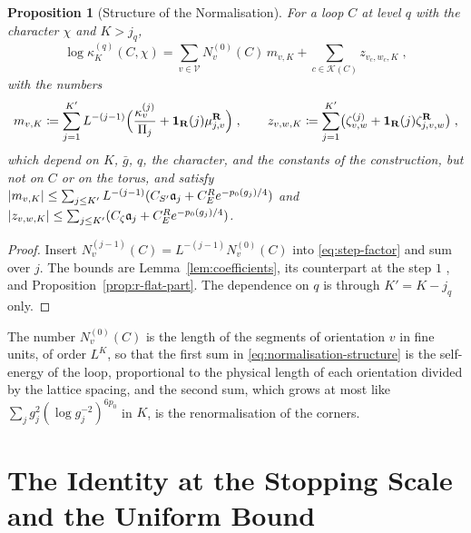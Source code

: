 \documentclass[11pt]{preprint}
\DeclarePairedDelimiter{\abs}{\lvert}{\rvert}
\numberwithin{equation}{section}
\newtheorem{proposition}[theorem]{Proposition}
\theoremstyle{definition}
\theoremstyle{remark}
\theoremstyle{plain}
\begin{document}
\begin{proposition}[Structure of the Normalisation]\label{prop:normalisation-structure}
For a loop $C$ at level $q$ with the character $\chi$ and $K > j_q$,
\begin{equation}\label{eq:normalisation-structure}
    \log\kappa^{(q)}_K(C, \chi) = \sum_{v \in \mathcal V}N^{(0)}_v(C)\,m_{v,K} + \sum_{c \in \mathcal K(C)}z_{v_c,w_c,K}\;,
\end{equation}
with the numbers
\begin{equation}\label{eq:mass-and-corner}
    m_{v,K} \coloneqq \sum_{j=1}^{K'}L^{-(j-1)}\Bigl(\frac{\kappa^{(j)}_v}{\Pi_j} + \mathbf 1_{\mathbf R}(j)\mu^{\mathbf R}_{j,v}\Bigr)\;,
    \qquad
    z_{v,w,K} \coloneqq \sum_{j=1}^{K'}\bigl(\zeta^{(j)}_{v,w} + \mathbf 1_{\mathbf R}(j)\zeta^{\mathbf R}_{j,v,w}\bigr)\;,
\end{equation}
which depend on $K$, $\bar g$, $q$, the character, and the constants of the construction, but not on $C$ or on the torus, and satisfy $\abs{m_{v,K}} \leq \sum_{j \leq K'}L^{-(j-1)}(C_{S'}\mathfrak a_j + C^R_Ee^{-p_0(g_j)/4})$ and $\abs{z_{v,w,K}} \leq \sum_{j \leq K'}(C_\zeta\mathfrak a_j + C^R_Ee^{-p_0(g_j)/4})$.
\end{proposition}

\begin{proof}
Insert $N^{(j-1)}_v(C) = L^{-(j-1)}N^{(0)}_v(C)$ into \eqref{eq:step-factor} and sum over $j$. The bounds are Lemma~\ref{lem:coefficients}, its counterpart at the step $1$ \cite[(5.31), (6.5)]{WilsonFirstStep}, and Proposition~\ref{prop:r-flat-part}. The dependence on $q$ is through $K' = K - j_q$ only.
\end{proof}

The number $N^{(0)}_v(C)$ is the length of the segments of orientation $v$ in fine units, of order $L^K$, so that the first sum in \eqref{eq:normalisation-structure} is the self-energy of the loop, proportional to the physical length of each orientation divided by the lattice spacing, and the second sum, which grows at most like $\sum_jg_j^2(\log g_j^{-2})^{6p_0}$ in $K$, is the renormalisation of the corners.

\section{The Identity at the Stopping Scale and the Uniform Bound}\label{sec:stopping-scale}
\end{document}
